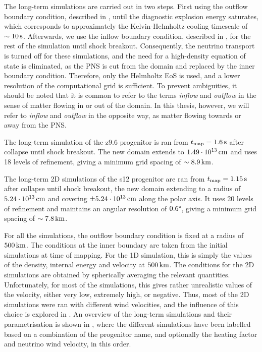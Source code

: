 The long-term simulations are carried out in two steps. First using the outflow boundary condition, described in , until the diagnostic explosion energy saturates, which corresponds to approximately the Kelvin-Helmholtz cooling timescale of \(\sim 10\,\mathrm{s}\). Afterwards, we use the inflow boundary condition, described in , for the rest of the simulation until shock breakout. Consequently, the neutrino transport is turned off for these simulations, and the need for a high-density equation of state is eliminated, as the PNS is cut from the domain and replaced by the inner boundary condition. Therefore, only the Helmholtz EoS is used, and a lower resolution of the computational grid is sufficient.  To prevent ambiguities, it should be noted that it is common to refer to the terms \emph{inflow} and \emph{outflow} in the sense of matter flowing in or out of the domain. In this thesis, however, we will refer to \emph{inflow} and \emph{outflow} in the opposite way, as matter flowing towards or away from the PNS.

The long-term simulation of the z9.6 progenitor is ran from \(t_\mathrm{map} = 1.6\,\mathrm{s}\) after collapse until shock breakout. The new domain extends to \(1.49 \cdot 10^{13}\,\mathrm{cm}\) and uses 18 levels of refinement, giving a minimum grid spacing of \(\sim8.9\,\mathrm{km}\).

The long-term 2D simulations of the s12 progenitor are ran from \(t_\mathrm{map} = 1.15\,\mathrm{s}\) after collapse until shock breakout, the new domain extending to a radius of \(5.24 \cdot 10^{13}\,\mathrm{cm}\) and covering \(\pm 5.24 \cdot 10^{13}\,\mathrm{cm}\) along the polar axis. It uses 20 levels of refinement and maintains an angular resolution of \(0.6\degree\), giving a minimum grid spacing of \(\sim7.8\,\mathrm{km}\).

For all the simulations, the outflow boundary condition is fixed at a radius of \(500\,\mathrm{km}\). The conditions at the inner boundary are taken from the initial simulations at time of mapping. For the 1D simulation, this is simply the values of the density, internal energy and velocity at \(500\,\mathrm{km}\). The conditions for the 2D simulations are obtained by spherically averaging the relevant quantities. Unfortunately, for most of the simulations, this gives rather unrealistic values of the velocity, either very low, extremely high, or negative. Thus, most of the 2D simulations were ran with different wind velocities, and the influence of this choice is explored in . An overview of the long-term simulations and their parametrisation is shown in , where the different simulations have been labelled based on a combination of the progenitor name, and optionally the heating factor and neutrino wind velocity, in this order.

